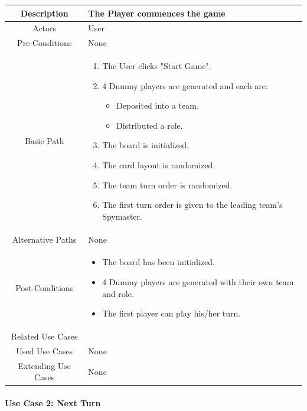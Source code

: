 \documentclass[10pt, a4paper]{article}
\begin{document}
			\begin{center}
				\begin{tabular}{ |c|p{10cm}| } 
					\hline
					Description & The Player commences the game  \\
					\hline 
					Actors & User \\
					\hline  
					Pre-Conditions & None \\
					\hline  
					Basic Path & 
						\begin{enumerate}
							\item The User clicks "Start Game".
							\item 4 Dummy players are generated and each are:
								\begin{itemize}
									\item Deposited into a team.
									\item Distributed a role.
								\end{itemize}
							\item The board is initialized.
							\item The card layout is randomized.
							\item The team turn order is randomized.
							\item The first turn order is given to the leading team's Spymaster.
						\end{enumerate}\\
					\hline
					Alternative Paths & None \\
					\hline
					Post-Conditions & 
						\begin{itemize}[noitemsep,topsep=0pt]
							\item The board has been initialized.
							\item 4 Dummy players are generated with their own team and role.
							\item The first player can play his/her turn.
						\end{itemize}\\
					\hline 
					Related Use Cases & \\
					\hline 
					Used Use Cases & None\\
					\hline 
					Extending Use Cases & None \\
					\hline 
				\end{tabular}
			\end{center}
		
			\newpage
			
			\paragraph{Use Case 2: Next Turn}
			
\end{document}

